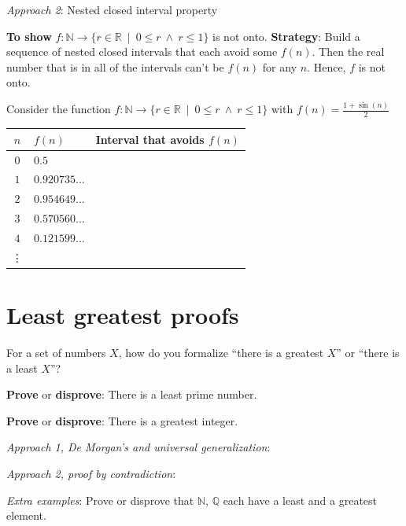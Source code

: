 \documentclass[12pt, oneside]{article}
\begin{document}
{\it Approach 2}: Nested closed interval property

{\bf To show} $f: \mathbb{N} \to \{  r \in \mathbb{R} ~\mid~ 0  \leq r ~\wedge~ r \leq 1 \}$ is not onto. 
{\bf  Strategy}: Build
a sequence of nested closed intervals that each avoid some $f(n)$.   Then  the real
number that is in all of the intervals  can't be $f(n)$ for any $n$. Hence,  $f$ is not  onto.

Consider the function $f: \mathbb{N} \to \{  r \in \mathbb{R} ~\mid~ 0 \leq r ~\wedge~ r \leq 1 \}$ with  $f(n) = \frac{1+\sin(n)}{2}$

\begin{center}
\begin{tabular}{c||p{1.65in} || p{3in} }
$n$ &  $f(n)$& Interval that avoids $f(n)$ \\
\hline
$0$ & $0.5$ &  \\
$1$ &$0.920735\ldots$  &  \\
$2$ &$0.954649\ldots$ &  \\
$3$ &$0.570560\ldots$ & \\
$4$ &$0.121599\ldots $&  \\
\vdots &  &\\
\end{tabular}
\end{center}
  \vfill
\section*{Least greatest proofs}


For a set of numbers $X$, how do you formalize ``there is a greatest $X$'' 
or ``there is a least $X$''?

\vspace{30pt}

{\bf Prove} or {\bf  disprove}:  There is a least prime number.

\vspace{100pt}

{\bf Prove} or {\bf  disprove}: There is a greatest integer. 

{\it Approach 1, De Morgan's and universal generalization}: 

\vspace{100pt}

{\it Approach 2, proof by contradiction}: 

\vspace{200pt}

{\it Extra examples}: 
Prove or disprove that $\mathbb{N}$,  $\mathbb{Q}$ each have a
least and a greatest element. 
 \vfill
\end{document}
